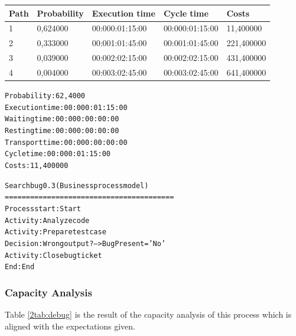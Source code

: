 \begin{table}[ht!]
\centering
\begin{tabular}{|l|l|l|l|l|}
\hline
Path&Probability&Execution time&Cycle time&Costs\\
\hline
1&0,624000&00:000:01:15:00&00:000:01:15:00&11,400000\\
\hline
2&0,333000&00:001:01:45:00&00:001:01:45:00&221,400000\\
\hline
3&0,039000&00:002:02:15:00&00:002:02:15:00&431,400000\\
\hline
4&0,004000&00:003:02:45:00&00:003:02:45:00&641,400000\\
\hline
\end{tabular}
\end{table}

\begin{alltt}
Probability:   62,4000%
Execution time:  00:000:01:15:00
Waiting time:  00:000:00:00:00
Resting time:  00:000:00:00:00
Transport time:  00:000:00:00:00
Cycle time:  00:000:01:15:00
Costs:  11,400000

Search bug 0.3 (Business process model)
========================================
Process start: Start
Activity: Analyze code
Activity: Prepare test case
Decision: Wrong output? --> BugPresent = 'No'
Activity: Close bug ticket
End: End
\end{alltt}

\subsubsection{Capacity Analysis}
Table \ref{2tab:debug} is the result of the capacity analysis of this
process which is aligned with the expectations given.

